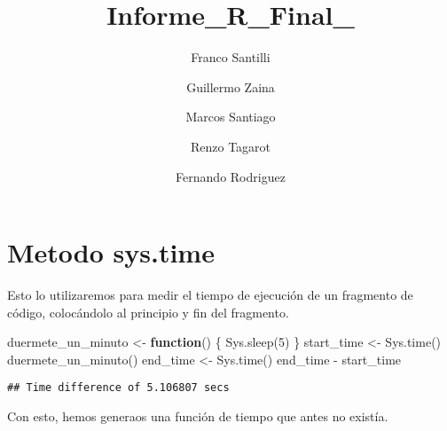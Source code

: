 \documentclass[]{elsarticle} %
\newenvironment{Shaded}{\begin{snugshade}}{\end{snugshade}}
\newcommand{\ControlFlowTok}[1]{\textcolor[rgb]{0.13,0.29,0.53}{\textbf{#1}}}
\newcommand{\DecValTok}[1]{\textcolor[rgb]{0.00,0.00,0.81}{#1}}
\newcommand{\FunctionTok}[1]{\textcolor[rgb]{0.00,0.00,0.00}{#1}}
\newcommand{\NormalTok}[1]{#1}
\newcommand{\OtherTok}[1]{\textcolor[rgb]{0.56,0.35,0.01}{#1}}
\newcommand{\SpecialCharTok}[1]{\textcolor[rgb]{0.00,0.00,0.00}{#1}}
\begin{document}
\begin{frontmatter}

  \title{Informe\_R\_Final\_}
    \author[Facultad de Ingeniería]{Franco Santilli%
  }
    \author[Facultad de Ingeniería]{Guillermo Zaina}
    \author[Facultad de Ingeniería]{Marcos Santiago%
  }
    \author[Facultad de Ingeniería]{Renzo Tagarot%
  }
    \author[Facultad de Ingeniería]{Fernando Rodriguez%
  }
  
  \begin{abstract}
  
  \end{abstract}
  
 \end{frontmatter}

\hypertarget{metodo-sys.time}{%
\section{Metodo sys.time}\label{metodo-sys.time}}

Esto lo utilizaremos para medir el tiempo de ejecución de un fragmento
de código, colocándolo al principio y fin del fragmento.

\begin{Shaded}
\begin{Highlighting}[]
\NormalTok{duermete\_un\_minuto }\OtherTok{\textless{}{-}} \ControlFlowTok{function}\NormalTok{() \{ }\FunctionTok{Sys.sleep}\NormalTok{(}\DecValTok{5}\NormalTok{) \}}
\NormalTok{start\_time }\OtherTok{\textless{}{-}} \FunctionTok{Sys.time}\NormalTok{()}
\FunctionTok{duermete\_un\_minuto}\NormalTok{()}
\NormalTok{end\_time }\OtherTok{\textless{}{-}} \FunctionTok{Sys.time}\NormalTok{()}
\NormalTok{end\_time }\SpecialCharTok{{-}}\NormalTok{ start\_time}
\end{Highlighting}
\end{Shaded}

\begin{verbatim}
## Time difference of 5.106807 secs
\end{verbatim}

Con esto, hemos generaos una función de tiempo que antes no existía.
\end{document}
